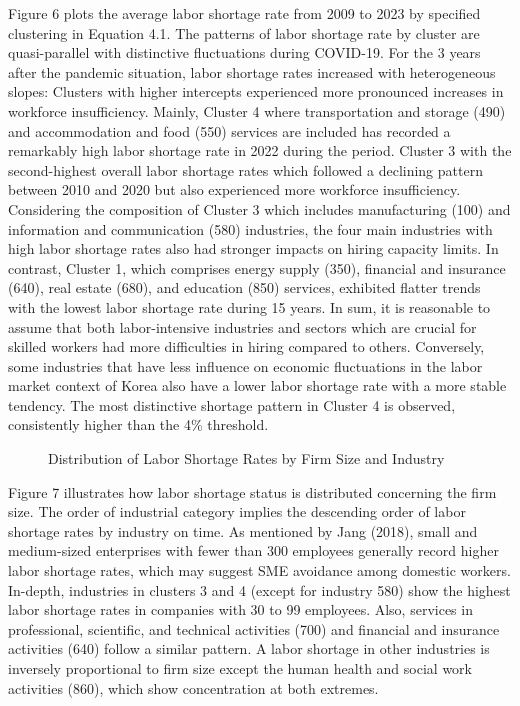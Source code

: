 \documentclass[
  12pt,
]{article}
\makeatletter
\newcommand*\pandocbounded[1]{%
  \sbox\pandoc@box{#1}%
  \Gscale@div\@tempa{\textheight}{\dimexpr\ht\pandoc@box+\dp\pandoc@box\relax}%
  \Gscale@div\@tempb{\linewidth}{\wd\pandoc@box}%
  \ifdim\@tempb\p@<\@tempa\p@\let\@tempa\@tempb\fi%
  \ifdim\@tempa\p@<\p@\scalebox{\@tempa}{\usebox\pandoc@box}%
  \else\usebox{\pandoc@box}%
  \fi%
}
\makeatother
\begin{document}
Figure 6 plots the average labor shortage rate from 2009 to 2023 by
specified clustering in Equation 4.1. The patterns of labor shortage
rate by cluster are quasi-parallel with distinctive fluctuations during
COVID-19. For the 3 years after the pandemic situation, labor shortage
rates increased with heterogeneous slopes: Clusters with higher
intercepts experienced more pronounced increases in workforce
insufficiency. Mainly, Cluster 4 where transportation and storage (490)
and accommodation and food (550) services are included has recorded a
remarkably high labor shortage rate in 2022 during the period. Cluster 3
with the second-highest overall labor shortage rates which followed a
declining pattern between 2010 and 2020 but also experienced more
workforce insufficiency. Considering the composition of Cluster 3 which
includes manufacturing (100) and information and communication (580)
industries, the four main industries with high labor shortage rates also
had stronger impacts on hiring capacity limits. In contrast, Cluster 1,
which comprises energy supply (350), financial and insurance (640), real
estate (680), and education (850) services, exhibited flatter trends
with the lowest labor shortage rate during 15 years. In sum, it is
reasonable to assume that both labor-intensive industries and sectors
which are crucial for skilled workers had more difficulties in hiring
compared to others. Conversely, some industries that have less influence
on economic fluctuations in the labor market context of Korea also have
a lower labor shortage rate with a more stable tendency. The most
distinctive shortage pattern in Cluster 4 is observed, consistently
higher than the 4\% threshold.

\begin{figure}
\centering
\pandocbounded{\texttt{[image: images/00003e.png]}}
\caption{Distribution of Labor Shortage Rates by Firm Size and Industry}
\end{figure}

Figure 7 illustrates how labor shortage status is distributed concerning
the firm size. The order of industrial category implies the descending
order of labor shortage rates by industry on time. As mentioned by Jang
(2018), small and medium-sized enterprises with fewer than 300 employees
generally record higher labor shortage rates, which may suggest SME
avoidance among domestic workers. In-depth, industries in clusters 3 and
4 (except for industry 580) show the highest labor shortage rates in
companies with 30 to 99 employees. Also, services in professional,
scientific, and technical activities (700) and financial and insurance
activities (640) follow a similar pattern. A labor shortage in other
industries is inversely proportional to firm size except the human
health and social work activities (860), which show concentration at
both extremes.
\end{document}
